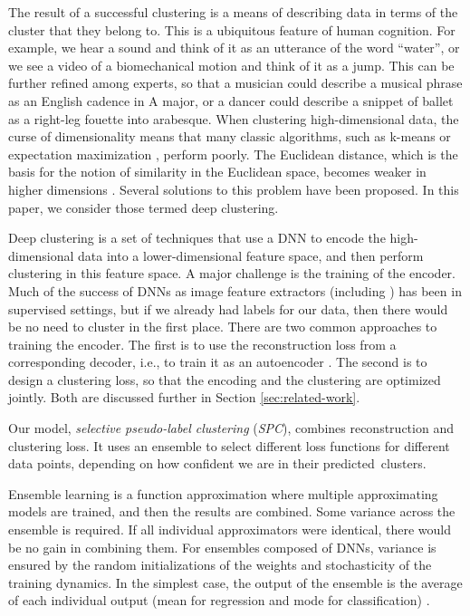 \documentclass[runningheads]{llncs}
\begin{document}
The result of a successful clustering is a means of describing data in terms of the cluster that they belong to. This is a ubiquitous feature of human cognition. For example, we hear a sound and think of it as an utterance of the word ``water'', or we see a video of a biomechanical motion and think of it as a jump.  This can be further refined among experts, so that a musician could describe a musical phrase as an English cadence in A major, or a dancer could describe a snippet of ballet as a right-leg fouette into arabesque. When clustering high-dimensional data, the curse of dimensionality \cite{bellman1966dynamic} means that many classic algorithms, such as k-means \cite{lloyd1957least} or expectation maximization \cite{dempster1977maximum}, perform poorly. The Euclidean distance, which is the basis for the notion of similarity in the Euclidean space, becomes weaker in higher dimensions \cite{zimek2012survey}. Several solutions to this problem have been proposed. In this paper, we consider those termed deep clustering.

Deep clustering is a set of techniques that use a DNN to encode the high-dimensional data into a lower-dimensional feature space, and then perform clustering in this feature space. A major challenge is the training of the encoder. Much of the success of DNNs as image feature extractors (including \cite{krizhevsky2012imagenet,zeiler2014visualizing}) has been in supervised settings, but if we already had labels for our data, then there would be no need to cluster in the first place. There are two common approaches to training the encoder. The first is to use the reconstruction loss from a corresponding decoder, i.e., to train it as an autoencoder \cite{zemel1994developing}. The second is to design a clustering loss, so that the encoding and the clustering are optimized jointly. Both are discussed further in Section \ref{sec:related-work}. 

Our model, \emph{selective pseudo-label clustering} (\emph{SPC}), combines reconstruction and clustering loss. It uses an ensemble to select different loss functions for different data points, depending on how confident we are in their 
predicted~clusters. 

Ensemble learning is a function approximation where multiple approximating models are trained, and then the results are combined. Some variance across the ensemble is required. If all individual approximators were identical, there would be no gain in combining them. For ensembles composed of DNNs, variance is ensured by the random initializations of the weights and stochasticity of the training dynamics. In the simplest case, the output of the ensemble is the average of each individual output (mean for regression and mode for classification) \cite{opitz1997empirical}.
\end{document}
